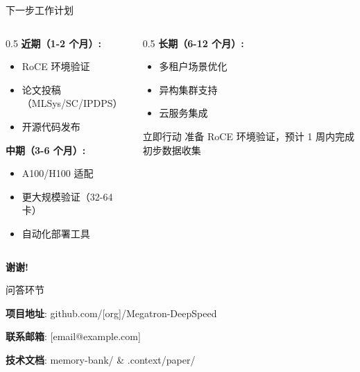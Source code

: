 \documentclass[aspectratio=169,10pt]{beamer}
\begin{document}
\begin{frame}{下一步工作计划}
\begin{columns}
\begin{column}{0.5\textwidth}
\textbf{近期（1-2 个月）:}
\begin{itemize}
    \item RoCE 环境验证
    \item 论文投稿（MLSys/SC/IPDPS）
    \item 开源代码发布
\end{itemize}
\vspace{0.3cm}
\textbf{中期（3-6 个月）:}
\begin{itemize}
    \item A100/H100 适配
    \item 更大规模验证（32-64 卡）
    \item 自动化部署工具
\end{itemize}
\end{column}
\begin{column}{0.5\textwidth}
\textbf{长期（6-12 个月）:}
\begin{itemize}
    \item 多租户场景优化
    \item 异构集群支持
    \item 云服务集成
\end{itemize}
\vspace{0.5cm}
\begin{alertblock}{立即行动}
准备 RoCE 环境验证，预计 1 周内完成初步数据收集
\end{alertblock}
\end{column}
\end{columns}
\end{frame}

\begin{frame}
\begin{center}
\Huge \textbf{谢谢!}
\vspace{1cm}

\Large 问答环节
\vspace{1cm}

\normalsize
\textbf{项目地址}: github.com/[org]/Megatron-DeepSpeed

\textbf{联系邮箱}: [email@example.com]

\textbf{技术文档}: memory-bank/ \& .context/paper/
\end{center}
\end{frame}

\appendix
\end{document}
